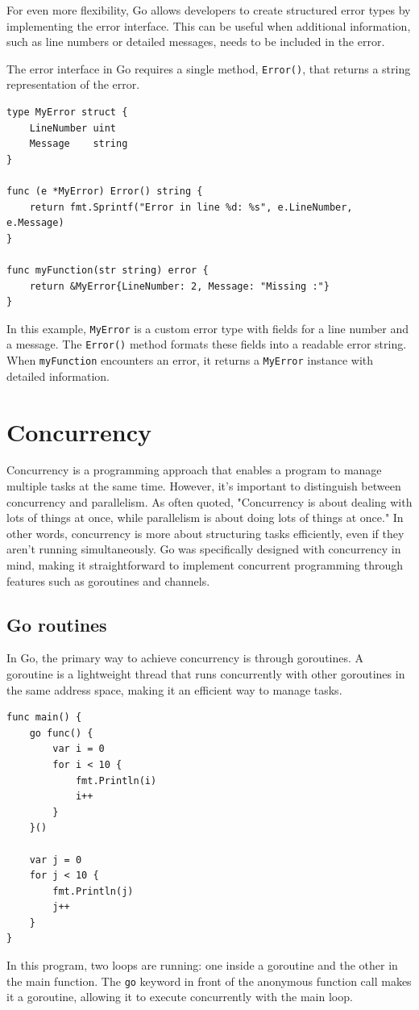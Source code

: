 For even more flexibility, Go allows developers to create structured error types by implementing the error interface. This can be useful when additional information, such as line numbers or detailed messages, needs to be included in the error.

The error interface in Go requires a single method, \texttt{Error()}, that returns a string representation of the error.

\begin{verbatim}
type MyError struct {
    LineNumber uint
    Message    string
}

func (e *MyError) Error() string {
    return fmt.Sprintf("Error in line %d: %s", e.LineNumber, e.Message)
}

func myFunction(str string) error {
    return &MyError{LineNumber: 2, Message: "Missing :"}
}
\end{verbatim}
In this example, \texttt{MyError} is a custom error type with fields for a line number and a message. The \texttt{Error()} method formats these fields into a readable error string. When \texttt{myFunction} encounters an error, it returns a \texttt{MyError} instance with detailed information.

\section{Concurrency}
Concurrency is a programming approach that enables a program to manage multiple tasks at the same time. However, it’s important to distinguish between concurrency and parallelism. As often quoted, "Concurrency is about dealing with lots of things at once, while parallelism is about doing lots of things at once." In other words, concurrency is more about structuring tasks efficiently, even if they aren't running simultaneously. Go was specifically designed with concurrency in mind, making it straightforward to implement concurrent programming through features such as goroutines and channels.

\subsection*{Go routines}
In Go, the primary way to achieve concurrency is through goroutines. A goroutine is a lightweight thread that runs concurrently with other goroutines in the same address space, making it an efficient way to manage tasks.

\begin{verbatim}
func main() {
    go func() {
        var i = 0
        for i < 10 {
            fmt.Println(i)
            i++
        }
    }()
    
    var j = 0
    for j < 10 {
        fmt.Println(j)
        j++
    }
}
\end{verbatim}
In this program, two loops are running: one inside a goroutine and the other in the main function. The \texttt{go} keyword in front of the anonymous function call makes it a goroutine, allowing it to execute concurrently with the main loop.

